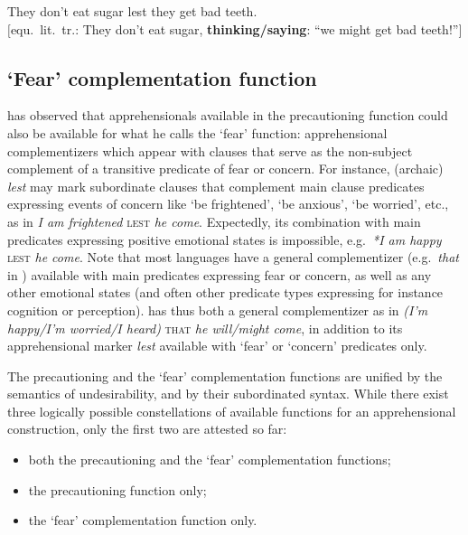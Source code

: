 \documentclass[output=paper,colorlinks,citecolor=brown]{langscibook}
\begin{document}
\ea \label{p57} They don't eat sugar lest they get bad teeth. \\
\textnormal{$[$equ.\ lit.\ tr.: They don't eat sugar, \textbf{thinking/saying}: ``we might get bad teeth!''$]$}
\z


\subsection{`Fear' complementation function}
\label{subsec:prefear}

\citet{lichtenberk1995} has observed that apprehensionals available in the precautioning function could also be available for what he calls the `fear' function: apprehensional complementizers which appear with clauses that serve as the non-subject complement of a transitive predicate of fear or concern. For instance, (archaic)  \textit{lest} may mark subordinate clauses that complement main clause predicates expressing events of concern like `be frightened', `be anxious', `be worried', etc., as in \textit{I am frightened} \textsc{lest} \textit{he come}. Expectedly, its combination with main predicates expressing positive emotional states is impossible, e.g.\ \textit{*I am happy} \textsc{lest} \textit{he come}. Note that most languages have a general complementizer (e.g.\ \textit{that} in ) available with main predicates expressing fear or concern, as well as any other emotional states (and often other predicate types expressing for instance cognition or perception).  has thus both a general complementizer as in \textit{(I'm happy/I'm worried/I heard)} \textsc{that} \textit{he will/might come}, in addition to its apprehensional marker \textit{lest} available with `fear' or `concern' predicates only.

The precautioning and the `fear' complementation functions are unified by the semantics of undesirability, and by their subordinated syntax. While there exist three logically possible constellations of available functions for an apprehensional construction, only the first two are attested so far:

\begin{itemize}
    \item both the precautioning and the `fear' complementation functions;
    \item the precautioning function only;
    \item the `fear' complementation function only.
\end{itemize}
\end{document}
